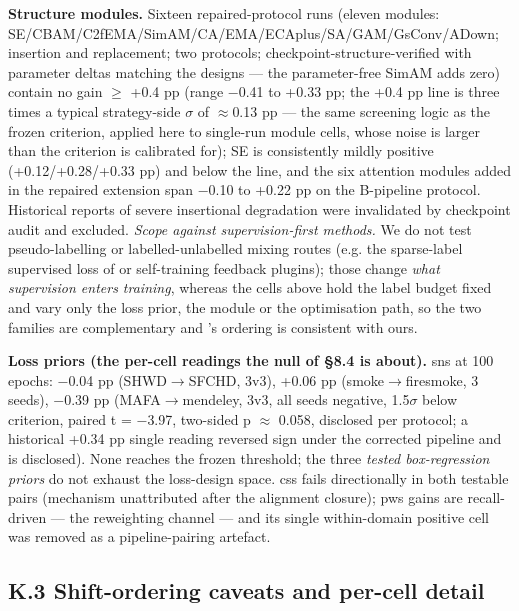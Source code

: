 \documentclass[pdflatex,sn-mathphys-ay]{sn-jnl}
\begin{document}
\textbf{Structure modules.} Sixteen repaired-protocol runs (eleven modules: SE/CBAM/C2fEMA/SimAM/CA/EMA/ECAplus/SA/GAM/GsConv/ADown; insertion and replacement; two protocols; checkpoint-structure-verified with parameter deltas matching the designs --- the parameter-free SimAM adds zero) contain no gain \ensuremath{\geq} +0.4 pp (range \ensuremath{-}0.41 to +0.33 pp; the +0.4 pp line is three times a typical strategy-side \ensuremath{\sigma} of \ensuremath{\approx}0.13 pp --- the same screening logic as the frozen criterion, applied here to single-run module cells, whose noise is larger than the criterion is calibrated for); SE is consistently mildly positive (+0.12/+0.28/+0.33 pp) and below the line, and the six attention modules added in the repaired extension span \ensuremath{-}0.10 to +0.22 pp on the B-pipeline protocol. Historical reports of severe insertional degradation were invalidated by checkpoint audit and excluded. \emph{Scope against supervision-first methods.} We do not test pseudo-labelling or labelled-unlabelled mixing routes (e.g. the sparse-label supervised loss of \citep{tian2025} or self-training feedback plugins); those change \emph{what supervision enters training}, whereas the cells above hold the label budget fixed and vary only the loss prior, the module or the optimisation path, so the two families are complementary and \citep{tian2025}'s ordering is consistent with ours.

\textbf{Loss priors (the per-cell readings the null of \S{}8.4 is about).} sns at 100 epochs: \ensuremath{-}0.04 pp (SHWD\ensuremath{\rightarrow}SFCHD, 3v3), +0.06 pp (smoke\ensuremath{\rightarrow}firesmoke, 3 seeds), \ensuremath{-}0.39 pp (MAFA\ensuremath{\rightarrow}mendeley, 3v3, all seeds negative, 1.5\ensuremath{\sigma} below criterion, paired t = \ensuremath{-}3.97, two-sided p \ensuremath{\approx} 0.058, disclosed per protocol; a historical +0.34 pp single reading reversed sign under the corrected pipeline and is disclosed). None reaches the frozen threshold; the three \emph{tested box-regression priors} do not exhaust the loss-design space. css fails directionally in both testable pairs (mechanism unattributed after the alignment closure); pws gains are recall-driven --- the reweighting channel --- and its single within-domain positive cell was removed as a pipeline-pairing artefact.

\subsection*{K.3 Shift-ordering caveats and per-cell detail}
\end{document}
